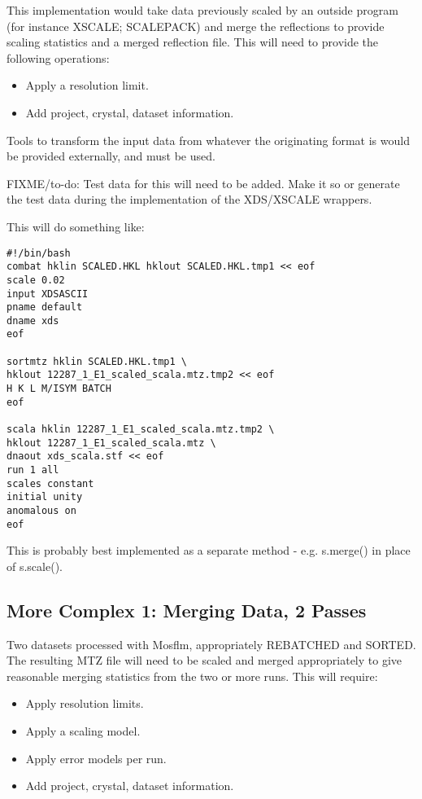 \documentclass[a4paper, 11pt]{article}
\begin{document}
This implementation would take data previously scaled by an outside program
(for instance XSCALE; SCALEPACK) and merge the reflections to provide
scaling statistics and a merged reflection file. This will need to provide
the following operations:

\begin{itemize}
\item{Apply a resolution limit.}
\item{Add project, crystal, dataset information.}
\end{itemize}

Tools to transform the input data from whatever the originating format is
would be provided externally, and must be used.

FIXME/to-do: Test data for this will need to be added. Make it so or generate
the test data during the implementation of the XDS/XSCALE wrappers.

This will do something like:

{
\tiny
\begin{verbatim}
#!/bin/bash
combat hklin SCALED.HKL hklout SCALED.HKL.tmp1 << eof
scale 0.02
input XDSASCII
pname default
dname xds
eof

sortmtz hklin SCALED.HKL.tmp1 \
hklout 12287_1_E1_scaled_scala.mtz.tmp2 << eof
H K L M/ISYM BATCH
eof

scala hklin 12287_1_E1_scaled_scala.mtz.tmp2 \
hklout 12287_1_E1_scaled_scala.mtz \
dnaout xds_scala.stf << eof
run 1 all
scales constant
initial unity
anomalous on
eof
\end{verbatim}
}

This is probably best implemented as a separate method - e.g. s.merge() in 
place of s.scale().

\subsection{More Complex 1: Merging Data, 
2 Passes}

Two datasets processed with Mosflm, appropriately REBATCHED and SORTED. The
resulting MTZ file will need to be scaled and merged appropriately to give
reasonable merging statistics from the two or more runs. This will require:

\begin{itemize}
\item{Apply resolution limits.}
\item{Apply a scaling model.}
\item{Apply error models per run.}
\item{Add project, crystal, dataset information.}
\end{itemize}
\end{document}
